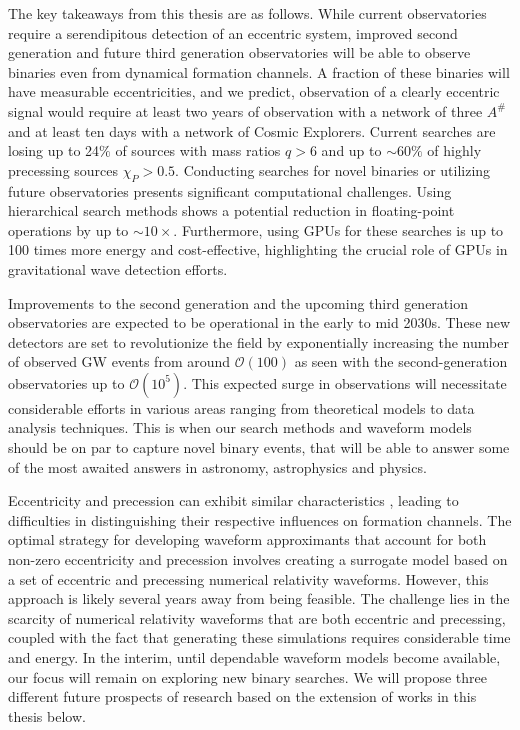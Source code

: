 The key takeaways from this thesis are as follows.  While current observatories require a serendipitous detection of an eccentric system, improved second generation and future third generation observatories will be able to observe binaries even from dynamical formation channels. A fraction of these binaries will have measurable eccentricities, and we predict, observation of a clearly eccentric signal would require at least two years of observation with a network of three $A^{\#}$ and at least ten days with a network of Cosmic Explorers. Current searches are losing up to 24$\%$ of sources with mass ratios $q > 6$ and up to $\sim 60\%$ of highly precessing sources $\chi_P > 0.5$. Conducting searches for novel binaries or utilizing future observatories presents significant computational challenges. Using hierarchical search methods shows a potential reduction in floating-point operations by up to $\sim 10\times$. Furthermore, using GPUs for these searches is up to 100 times more energy and cost-effective, highlighting the crucial role of GPUs in gravitational wave detection efforts.


Improvements to the second generation and the upcoming third generation observatories are expected to be operational in the early to mid 2030s. These new detectors are set to revolutionize the field by exponentially increasing the number of observed GW events from around  $\mathcal{O}(100)$ as seen with the second-generation observatories up to $\mathcal{O}(10^5)$. This expected surge in observations will necessitate considerable efforts in various areas ranging from theoretical models to data analysis techniques. This is when our search methods and waveform models should be on par to capture novel binary events, that will be able to answer some of the most awaited answers in astronomy, astrophysics and physics. 

Eccentricity and precession can exhibit similar characteristics \cite{Romero-Shaw:2022fbf}, leading to difficulties in distinguishing their respective influences on formation channels. The optimal strategy for developing waveform approximants that account for both non-zero eccentricity and precession involves creating a surrogate model based on a set of eccentric and precessing numerical relativity waveforms. However, this approach is likely several years away from being feasible. The challenge lies in the scarcity of numerical relativity waveforms that are both eccentric and precessing, coupled with the fact that generating these simulations requires considerable time and energy. In the interim, until dependable waveform models become available, our focus will remain on exploring new binary searches. We will propose three different future prospects of research based on the extension of works in this thesis below. 


